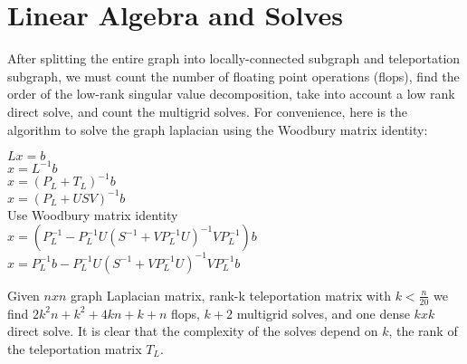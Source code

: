\documentclass{article}
\begin{document}
\section{Linear Algebra and Solves}
After splitting the entire graph into locally-connected subgraph and teleportation subgraph, we must count the number of floating point operations (flops), find the order of the low-rank singular value decomposition, take into account a low rank direct solve, and count the multigrid solves. For convenience, here is the algorithm to solve the graph laplacian using the Woodbury matrix identity:\\
\begin{center}
$Lx=b$\\
$x = L^{-1}b$\\
$x = (P_L+T_L)^{-1}b$\\
$x = (P_L+USV)^{-1}b$\\
Use Woodbury matrix identity\\
$x = (P_L^{-1}-P_L^{-1}U(S^{-1}+VP_L^{-1}U)^{-1}VP_L^{-1})b$\\
$x = P_L^{-1}b-P_L^{-1}U(S^{-1}+VP_L^{-1}U)^{-1}VP_L^{-1}b$\\
\end{center}
Given $n x n$ graph Laplacian matrix, rank-k teleportation matrix with $k<\frac{n}{20}$ we find $2k^{2}n + k^{2} + 4kn + k + n$ flops, $k + 2$ multigrid solves, and one dense $k x k$ direct solve. It is clear that the complexity of the solves depend on $k$, the rank of the teleportation matrix $T_L$.




\end{document}
